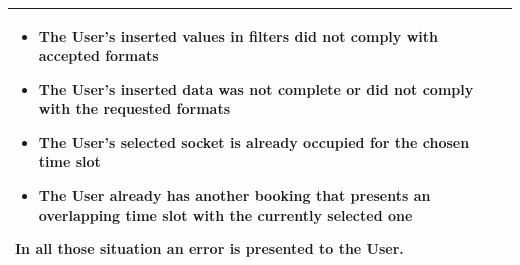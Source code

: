 \documentclass[11pt]{article}
\begin{document}
\begin{description}
\begin{table}[H]
\begin{tabularx}{\textwidth}{|>{\hsize=0.5\hsize}X|>{\hsize=1.5\hsize}X|}
\begin{minipage}[t]{\hsize}
                \vspace{0pt}
                \begin{itemize}[topsep=0pt, leftmargin=*]
                    \item The User's inserted values in filters did not comply with accepted formats
                    \item The User's inserted data was not complete or did not comply with the requested formats
                    \item The User's selected socket is already occupied for the chosen time slot
                    \item The User already has another booking that presents an overlapping time slot with the currently selected one
                \end{itemize}
                \vspace{8pt}
                \end{minipage}
                In all those situation an error is presented to the User.
                \vspace{6pt}
            \\
            \hline
        \end{tabularx}
    \end{table}
    

\end{description}
\end{document}
